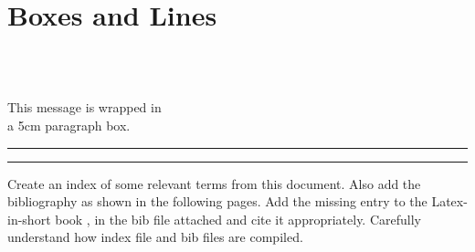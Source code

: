 \documentclass[a4paper,10pt]{article}
\begin{document}
\section{Boxes and Lines}
%
\usebox{\msgbox}\\
\usebox{\msgbox}\\
\usebox{\msgbox}

\medskip
\noindent\parbox{5cm}{This message is wrapped in\\ a 5cm paragraph box.}

\medskip
\rule{1mm}{7mm}

\medskip
\noindent{}

\bigskip
\noindent\rule{\textwidth}{1pt}

\noindent Create an index of some relevant terms from this document. Also
add the bibliography \cite{overleaf} as shown in the following pages. Add
the missing entry to the Latex-in-short book \cite{lshort}, in the bib file
attached and cite it appropriately. Carefully understand how index file and
bib files are compiled.

\newpage
\printindex

\newpage

\renewcommand{\refname}{References}

\end{document}
